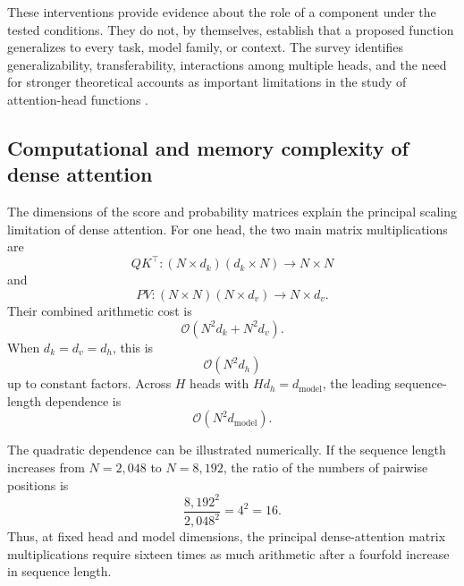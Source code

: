 These interventions provide evidence about the role of a component under
the tested conditions. They do not, by themselves, establish that a
proposed function generalizes to every task, model family, or context.
The survey identifies generalizability, transferability, interactions
among multiple heads, and the need for stronger theoretical accounts as
important limitations in the study of attention-head functions
\parencite{zheng2024attentionheads}.

\subsection{Computational and memory complexity of dense attention}
\label{subsec:attn-computational-memory-complexity}

The dimensions of the score and probability matrices explain the principal
scaling limitation of dense attention. For one head, the two main matrix
multiplications are
\begin{equation}
    QK^\top:
    (N\times d_k)(d_k\times N)
    \longrightarrow
    N\times N
    \label{eq:attn-complexity-score-shape}
\end{equation}
and
\begin{equation}
    PV:
    (N\times N)(N\times d_v)
    \longrightarrow
    N\times d_v.
    \label{eq:attn-complexity-value-shape}
\end{equation}
Their combined arithmetic cost is
\begin{equation}
    \mathcal{O}(N^2d_k+N^2d_v).
    \label{eq:attn-complexity-one-head}
\end{equation}
When \(d_k=d_v=d_h\), this is
\begin{equation}
    \mathcal{O}(N^2d_h)
    \label{eq:attn-complexity-one-head-equal}
\end{equation}
up to constant factors. Across \(H\) heads with
\(Hd_h=d_{\mathrm{model}}\), the leading sequence-length dependence is
\begin{equation}
    \boxed{
    \mathcal{O}(N^2d_{\mathrm{model}})
    }.
    \label{eq:attn-complexity-mha}
\end{equation}

The quadratic dependence can be illustrated numerically. If the sequence
length increases from \(N=2{,}048\) to \(N=8{,}192\), the ratio of the
numbers of pairwise positions is
\begin{equation}
    \frac{8{,}192^2}{2{,}048^2}
    =
    4^2
    =
    16.
    \label{eq:attn-quadratic-example}
\end{equation}
Thus, at fixed head and model dimensions, the principal dense-attention
matrix multiplications require sixteen times as much arithmetic after a
fourfold increase in sequence length.

